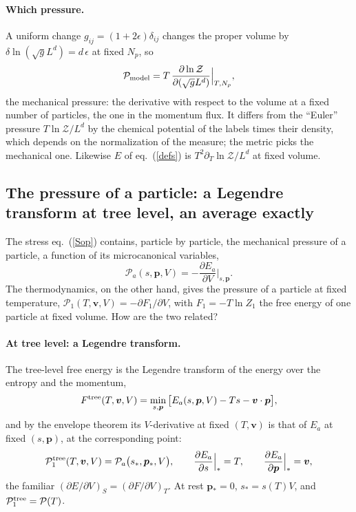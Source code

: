 \documentclass[11pt,aps,preprint,nofootinbib,superscriptaddress,tightenlines]{revtex4-2}
\def\pr{{\mathcal P}}
\def\st{\begin{equation}}
\def\stp{\end{equation}}
\def\Eq#1{eq.~(\ref{#1})}
\let\oldparagraph\paragraph
\renewcommand{\paragraph}{\par\bigskip\oldparagraph}
\begin{document}
\paragraph{Which pressure.}  A uniform change $g_{ij}=(1+2\epsilon)\delta_{ij}$ changes the proper volume by $\delta\ln(\sqrt gL^d)=d\,\epsilon$ at fixed $N_p$, so
\st
\pr_{\rm model}=T\,\frac{\partial\ln\mathcal Z}{\partial(\sqrt gL^d)}\Big|_{T,N_p} ,
\stp
the mechanical pressure: the derivative with respect to the volume at a fixed number of particles, the one in the momentum flux.  It differs from the ``Euler''
pressure $T\ln\mathcal Z/L^d$ by the chemical potential of the labels times their density, which depends on the normalization of the measure; the metric picks the
mechanical one.  Likewise $E$ of \Eq{defs} is $T^2\partial_T\ln\mathcal Z/L^d$ at fixed volume.

\subsection{The pressure of a particle: a Legendre transform at tree level, an average exactly}
\label{sec:particlepressure}

The stress \Eq{Sop} contains, particle by particle, the mechanical pressure of a particle, a function of its microcanonical variables,
\st
\pr_a(s,\bm p,V)=-\frac{\partial E_a}{\partial V}\Big|_{s,\bm p} .
\stp
The thermodynamics, on the other hand, gives the pressure of a particle at fixed temperature, $\pr_1(T,\bm v,V)=-\partial F_1/\partial V$, with $F_1=-T\ln Z_1$ the free
energy of one particle at fixed volume.  How are the two related?

\paragraph{At tree level: a Legendre transform.}  The tree-level free energy is the Legendre transform of the energy over the entropy and the momentum,
\st
F^{\rm tree}(T,\bm v,V)=\min_{s,\bm p}\big[E_a(s,\bm p,V)-Ts-\bm v\cdot\bm p\big] ,
\stp
and by the envelope theorem its $V$-derivative at fixed $(T,\bm v)$ is that of $E_a$ at fixed $(s,\bm p)$, at the corresponding point:
\st
\pr_1^{\rm tree}(T,\bm v,V)=\pr_a\big(s_*,\bm p_*,V\big),\qquad \frac{\partial E_a}{\partial s}\Big|_*=T,\qquad \frac{\partial E_a}{\partial\bm p}\Big|_*=\bm v ,
\stp
the familiar $(\partial E/\partial V)_S=(\partial F/\partial V)_T$.  At rest $\bm p_*=0$, $s_*=s(T)V$, and $\pr_1^{\rm tree}=\pr(T)$.
\end{document}
